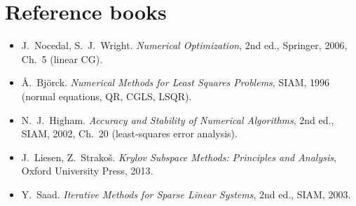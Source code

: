 \documentclass[11pt,a4paper]{article}
\begin{document}
\section{Reference books}
\begin{itemize}
\item J.~Nocedal, S.~J.~Wright. \emph{Numerical Optimization}, 2nd ed., Springer, 2006, Ch.~5 (linear CG).
\item Å.~Björck. \emph{Numerical Methods for Least Squares Problems}, SIAM, 1996 (normal equations, QR, CGLS, LSQR).
\item N.~J.~Higham. \emph{Accuracy and Stability of Numerical Algorithms}, 2nd ed., SIAM, 2002, Ch.~20 (least-squares error analysis).
\item J.~Liesen, Z.~Strakoš. \emph{Krylov Subspace Methods: Principles and Analysis}, Oxford University Press, 2013.
\item Y.~Saad. \emph{Iterative Methods for Sparse Linear Systems}, 2nd ed., SIAM, 2003.
\end{itemize}
\end{document}
